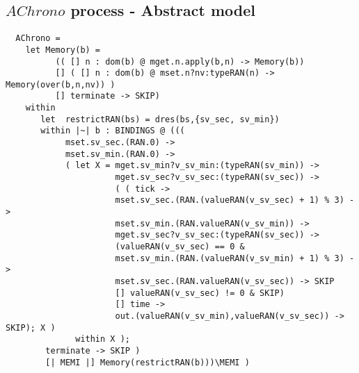 \subsection{$AChrono$ process - Abstract model}

\begin{verbatim}
  AChrono =
    let Memory(b) =
          (( [] n : dom(b) @ mget.n.apply(b,n) -> Memory(b))
          [] ( [] n : dom(b) @ mset.n?nv:typeRAN(n) -> Memory(over(b,n,nv)) )
          [] terminate -> SKIP)
    within
       let  restrictRAN(bs) = dres(bs,{sv_sec, sv_min})
       within |~| b : BINDINGS @ (((
            mset.sv_sec.(RAN.0) ->
            mset.sv_min.(RAN.0) ->
            ( let X = mget.sv_min?v_sv_min:(typeRAN(sv_min)) ->
                      mget.sv_sec?v_sv_sec:(typeRAN(sv_sec)) ->
                      ( ( tick ->
                      mset.sv_sec.(RAN.(valueRAN(v_sv_sec) + 1) % 3) ->
                      mset.sv_min.(RAN.valueRAN(v_sv_min)) ->
                      mget.sv_sec?v_sv_sec:(typeRAN(sv_sec)) ->
                      (valueRAN(v_sv_sec) == 0 &
                      mset.sv_min.(RAN.(valueRAN(v_sv_min) + 1) % 3) ->
                      mset.sv_sec.(RAN.valueRAN(v_sv_sec)) -> SKIP
                      [] valueRAN(v_sv_sec) != 0 & SKIP)
                      [] time ->
                      out.(valueRAN(v_sv_min),valueRAN(v_sv_sec)) -> SKIP); X )
              within X );
        terminate -> SKIP )
        [| MEMI |] Memory(restrictRAN(b)))\MEMI )
\end{verbatim}

\pagebreak
